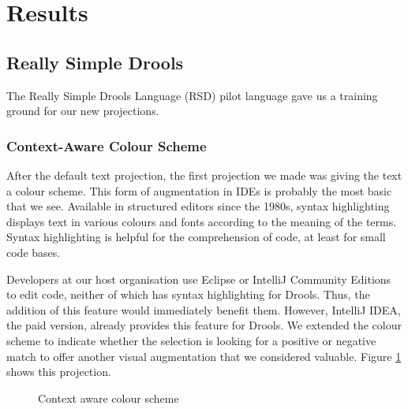 \section{Results}
\label{section:dsr_results}

\subsection{Really Simple Drools}

The Really Simple Drools Language (RSD) pilot language gave us a training ground for our new projections.

\subsubsection{Context-Aware Colour Scheme}
After the default text projection, the first projection we made was giving the text a colour scheme.
This form of augmentation in IDEs is probably the most basic that we see.
Available in structured editors since the 1980s\cite{cowlishaw1987lexx}, syntax highlighting displays text in various colours and fonts according to the meaning of the terms.
Syntax highlighting is helpful for the comprehension of code, at least for small code bases\cite{sarkar2015impact}.

Developers at our host organisation use Eclipse or IntelliJ Community Editions to edit code, neither of which has syntax highlighting for Drools. Thus, the addition of this feature would immediately benefit them.
However, IntelliJ IDEA, the paid version, already provides this feature for Drools.
We extended the colour scheme to indicate whether the selection is looking for a positive or negative match to offer another visual augmentation that we considered valuable.
Figure \ref{fig:colorscheme} shows this projection.

\begin{figure}[h]
    \centering
    \caption{Context aware colour scheme}
    \label{fig:colorscheme}
\end{figure}

